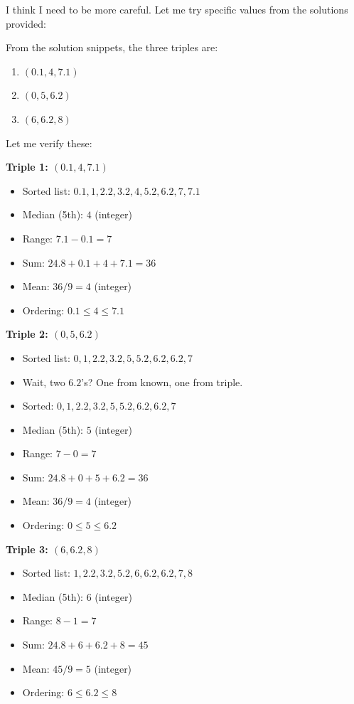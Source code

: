 \documentclass[11pt]{article}
\begin{document}
\begin{solutionbox}
I think I need to be more careful. Let me try specific values from the solutions provided:

From the solution snippets, the three triples are:
\begin{enumerate}
    \item $(0.1, 4, 7.1)$
    \item $(0, 5, 6.2)$
    \item $(6, 6.2, 8)$
\end{enumerate}

Let me verify these:

\textbf{Triple 1: $(0.1, 4, 7.1)$}
\begin{itemize}
    \item Sorted list: $0.1, 1, 2.2, 3.2, 4, 5.2, 6.2, 7, 7.1$
    \item Median (5th): $4$ \checkmark (integer)
    \item Range: $7.1 - 0.1 = 7$ \checkmark
    \item Sum: $24.8 + 0.1 + 4 + 7.1 = 36$
    \item Mean: $36/9 = 4$ \checkmark (integer)
    \item Ordering: $0.1 \leq 4 \leq 7.1$ \checkmark
\end{itemize}

\textbf{Triple 2: $(0, 5, 6.2)$}
\begin{itemize}
    \item Sorted list: $0, 1, 2.2, 3.2, 5, 5.2, 6.2, 6.2, 7$ 
    \item Wait, two $6.2$'s? One from known, one from triple.
    \item Sorted: $0, 1, 2.2, 3.2, 5, 5.2, 6.2, 6.2, 7$
    \item Median (5th): $5$ \checkmark (integer)
    \item Range: $7 - 0 = 7$ \checkmark
    \item Sum: $24.8 + 0 + 5 + 6.2 = 36$
    \item Mean: $36/9 = 4$ \checkmark (integer)
    \item Ordering: $0 \leq 5 \leq 6.2$ \checkmark
\end{itemize}

\textbf{Triple 3: $(6, 6.2, 8)$}
\begin{itemize}
    \item Sorted list: $1, 2.2, 3.2, 5.2, 6, 6.2, 6.2, 7, 8$
    \item Median (5th): $6$ \checkmark (integer)
    \item Range: $8 - 1 = 7$ \checkmark
    \item Sum: $24.8 + 6 + 6.2 + 8 = 45$
    \item Mean: $45/9 = 5$ \checkmark (integer)
    \item Ordering: $6 \leq 6.2 \leq 8$ \checkmark
\end{itemize}


\end{solutionbox}
\end{document}
